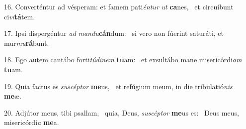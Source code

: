 16. Converténtur ad vésperam: et famem pati\textit{én}\textit{tur} \textit{ut} \textbf{ca}nes, \ast\  et circuíbunt ci\textit{vi}\textbf{tá}tem.\

17. Ipsi dispergéntur \textit{ad} \textit{man}\textit{du}\textbf{cán}dum: \ast\  si vero non fúerint saturáti, et mur\textit{mu}\textbf{rá}bunt.\

18. Ego autem cantábo forti\textit{tú}\textit{di}\textit{nem} \textbf{tu}am: \ast\  et exsultábo mane misericórdi\textit{am} \textbf{tu}am.\

19. Quia factus es \textit{su}\textit{scép}\textit{tor} \textbf{me}us, \ast\  et refúgium meum, in die tribulatió\textit{nis} \textbf{me}æ.\

20. Adjútor meus, tibi psallam, \dag\  quia, Deus, \textit{su}\textit{scép}\textit{tor} \textbf{me}us es: \ast\  Deus meus, misericórdi\textit{a} \textbf{me}a.\

